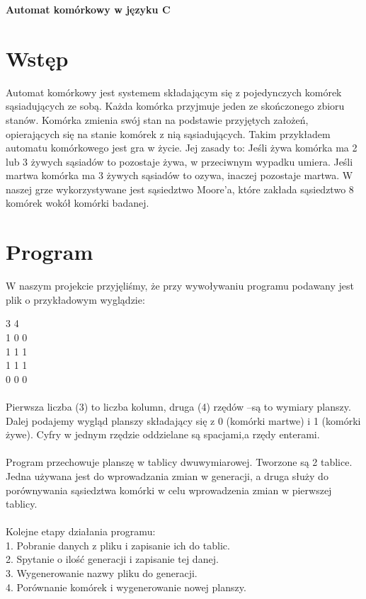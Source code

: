 \documentclass[11pt]{article}
\begin{document}
\begin{huge}
\begin{center}
\textbf{Automat kom\'orkowy w j\k{e}zyku C}\\
\end{center}
\end{huge}

\section{Wst\k{e}p}
Automat komórkowy jest systemem składającym się z pojedynczych komórek sąsiadujących ze sobą. Każda komórka przyjmuje jeden ze skończonego zbioru stanów. Komórka zmienia swój stan na podstawie przyjętych założeń, opierających się na stanie komórek z nią sąsiadujących. Takim przykładem automatu komórkowego jest gra w życie. Jej zasady to:
Jeśli żywa komórka ma 2 lub 3 żywych sąsiadów to pozostaje żywa, w przeciwnym wypadku umiera. Jeśli martwa komórka ma 3 żywych sąsiadów to ozywa, inaczej pozostaje martwa.
W naszej grze wykorzystywane jest sąsiedztwo Moore’a, które zakłada sąsiedztwo 8 komórek wokół komórki badanej.


\section{Program}

W naszym projekcie przyjęliśmy, że przy wywoływaniu programu podawany jest plik o przykładowym wyglądzie:

3 4\\
1 0 0\\
1 1 1\\
1 1 1\\
0 0 0\\
\\
Pierwsza liczba (3) to liczba kolumn, druga (4) rzędów –są to wymiary planszy. Dalej podajemy wygląd planszy składający się z 0 (komórki martwe) i 1 (komórki żywe). Cyfry w jednym rzędzie oddzielane są spacjami,a rzędy enterami.
\\
\\
Program przechowuje planszę w tablicy dwuwymiarowej. Tworzone są 2 tablice. Jedna używana jest do wprowadzania zmian w generacji, a druga służy do porównywania sąsiedztwa komórki w celu wprowadzenia zmian w pierwszej tablicy.
\\
\\
Kolejne etapy działania programu:\\
1.	Pobranie danych z pliku i zapisanie ich do tablic.\\
2.	Spytanie o ilość generacji i zapisanie tej danej.\\
3.	Wygenerowanie nazwy pliku do generacji.\\
4.	Porównanie komórek i wygenerowanie nowej planszy.
\end{document}
